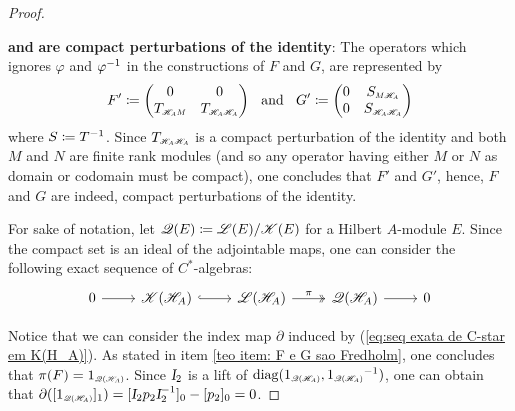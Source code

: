 \begin{teorema}
\begin{proof}
\begin{itroman}
    \item \label{teo item: F e G sao Fredholm} \textbf{and}  \textbf{are compact perturbations of the identity}: The operators which ignores $\varphi$ and ${\varphi}^{-1}$ in the constructions of $F$ and $G$, are represented by
    \begin{equation*}
        F' \coloneqq 
        \begin{pmatrix}
            0 & 0 \\
            \sub{T}{\HA M} & \sub{T}{\HA\HA}
        \end{pmatrix} \e G' \coloneqq \begin{pmatrix}
            0 & \sub{S}{M\HA} \\
            0 & \sub S{\HA\HA}
        \end{pmatrix}
    \end{equation*}
    where $S \coloneqq {T}^{-1}$. Since $\sub{T}{\HA\HA}$ is a compact perturbation of the identity and both $M$ and $N$ are finite rank modules (and so any operator having either $M$ or $N$ as domain or codomain must be compact), one concludes that $F'$ and $G'$, hence, $F$ and $G$ are indeed, compact perturbations of the identity.
\end{itroman}
For sake of notation, let $\mathscr Q(E) \coloneqq {\mathscr L(E)}/{\mathscr K(E)}$ for a Hilbert $A$-module $E$. Since the compact set is an ideal of the adjointable maps, one can consider the following exact sequence of $C^*$-algebras:
\begin{equation}
    \label{eq:seq exata de C-star em K(H_A)}
\begin{tikzcd}
0 \arrow[r] & \mathscr K(\HA) \arrow[r, hook] & \adj(\HA) \arrow[r, "\pi", two heads] & \mathscr Q(\HA) \arrow[r] & 0
\end{tikzcd}
\end{equation}

Notice that we can consider the index map $\partial$ induced by (\ref{eq:seq exata de C-star em K(H_A)}). As stated in item \ref{teo item: F e G sao Fredholm}, one concludes that $\pi(F)= \sub1{\mathscr Q(\HA)}$. Since $\textsl{I}_2$ is a lift of $\diag(\sub1{\mathscr Q(\HA)}, \inv{\sub1{\mathscr Q(\HA)}})$, one can obtain that $\partial([\sub1{\mathscr Q(\HA)}]_1) = [\Id_2 p_2\Id_2^{-1}]_0 - [p_2]_0 = 0$.


\end{proof}
\end{teorema}
